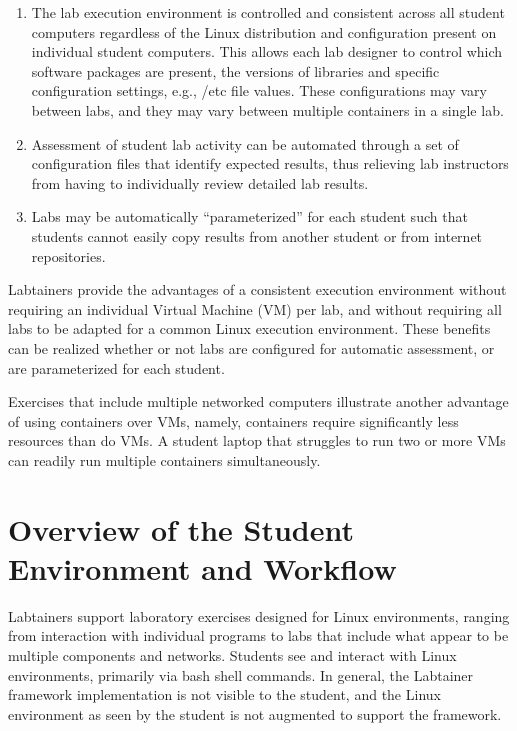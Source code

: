 \documentclass[12pt]{article}
\begin{document}
\begin{enumerate}
\item The lab execution environment is controlled and consistent
across all student computers regardless of the Linux distribution
and configuration present on individual student computers.  
This allows each lab designer to control
which software packages are present, the versions of libraries and
specific configuration settings, e.g., /etc file values. These configurations
may vary between labs, and they may vary between multiple containers in
a single lab.

\item Assessment of student lab activity can be automated through a
set of configuration files that identify expected results, thus
relieving lab instructors from having to individually review detailed lab
results.

\item Labs may be automatically ``parameterized'' for each student such that
students cannot easily copy results from another student or from internet
repositories.  
\end{enumerate}

Labtainers provide the advantages of a consistent
execution environment without requiring
an individual Virtual Machine (VM) per lab, and without requiring all labs to be adapted for
a common Linux execution environment.   These benefits can be realized 
whether or not labs are configured for automatic assessment, 
or are parameterized for each student.

Exercises that include multiple networked computers illustrate another advantage 
of using containers over VMs, namely, containers require significantly less resources
than do VMs.  A student laptop that struggles to run two or more VMs can readily 
run multiple containers simultaneously. 

\section {Overview of the Student Environment and Workflow}
Labtainers support laboratory exercises designed for Linux environments,
ranging from interaction with individual programs to labs that include
what appear to be multiple components and networks.  Students see and interact with Linux
environments, primarily via bash shell commands. In general, the Labtainer
framework implementation is not visible to the student, and the Linux
environment as seen by the student is not augmented to support the framework.
\end{document}

